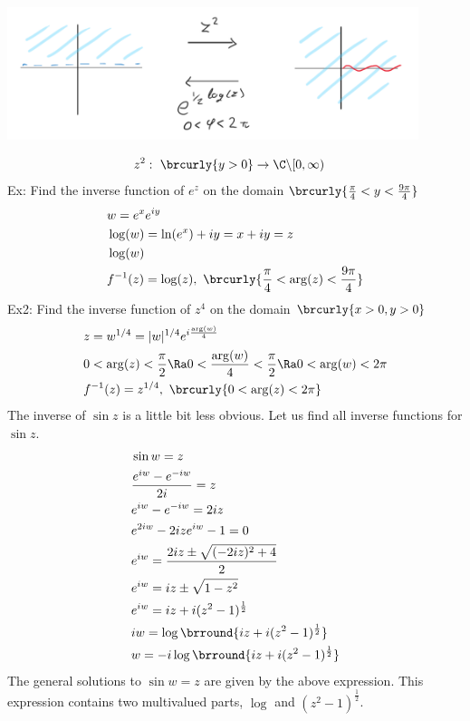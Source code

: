 \centerline{\includegraphics[width=0.9\textwidth]{Images/ComplexAnalysisPictures/QuadraticInverse2.png}}
\begin{align*}
    &z^2:\ \brcurly{y>0}\to\C\backslash[0,\infty)
\end{align*}
Ex: Find the inverse function of $e^z$ on the domain $\brcurly{\frac{\pi}{4}<y<\frac{9\pi}{4}}$
\begin{align*}
    &w=e^{x}e^{iy}\\
    &\log(w)=\ln(e^x)+iy=x+iy=z\\
    &\log(w)\\
    &f^{-1}(z)=\log(z),\ \brcurly{\frac{\pi}{4}<\arg(z)<\frac{9\pi}{4}}
\end{align*}
Ex2: Find the inverse function of $z^4$ on the domain $\brcurly{x>0,y>0}$
\begin{align*}
    &z=w^{1/4}=|w|^{1/4}e^{i\frac{\arg(w)}{4}}\\
    &0<\arg(z)<\frac{\pi}{2}\Ra 0<\frac{\arg(w)}{4}<\frac{\pi}{2}\Ra 0<\arg(w)<2\pi\\
    &f^{-1}(z)=z^{1/4},\ \brcurly{0<\arg(z)<2\pi}
\end{align*}
The inverse of $\sin z$ is a little bit less obvious. Let us find all inverse functions for $\sin z$.
\begin{align*}
    &\sin w=z\\
    &\frac{e^{iw}-e^{-iw}}{2i}=z\\
    &e^{iw}-e^{-iw}=2iz\\
    &e^{2iw}-2ize^{iw}-1=0\\
    &e^{iw}=\frac{2iz\pm\sqrt{(-2iz)^2+4}}{2}\\
    &e^{iw}=iz\pm\sqrt{1-z^2}\\
    &e^{iw}=iz+i(z^2-1)^\frac{1}{2}\\
    &iw=\log\brround{iz+i(z^2-1)^\frac{1}{2}}\\
    &w=-i\log\brround{iz+i(z^2-1)^\frac{1}{2}}
\end{align*}
The general solutions to $\sin w=z$ are given by the above expression. This expression contains two multivalued parts, $\log$ and $(z^2-1)^\frac{1}{2}$.\\
